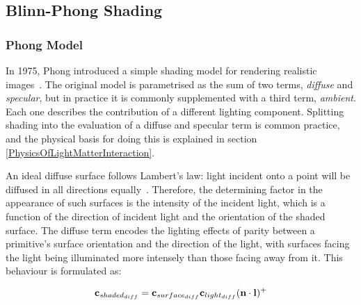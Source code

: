 \subsection{Blinn-Phong Shading} \label{BlinnPhongShading}

\subsubsection{Phong Model}

In 1975, Phong introduced a simple shading model for rendering realistic images~\cite{PhongShading}. The original model is parametrised as the sum of two terms, \textit{diffuse} and \textit{specular}, but in practice it is commonly supplemented with a third term, \textit{ambient}. Each one describes the contribution of a different lighting component. Splitting shading into the evaluation of a diffuse and specular term is common practice, and the physical basis for doing this is explained in section \ref{PhysicsOfLightMatterInteraction}.

An ideal diffuse surface follows Lambert's law: light incident onto a point will be diffused in all directions equally~\cite{Lambert}. Therefore, the determining factor in the appearance of such surfaces is the intensity of the incident light, which is a function of the direction of incident light and the orientation of the shaded surface. The diffuse term encodes the lighting effects of parity between a primitive's surface orientation and the direction of the light, with surfaces facing the light being illuminated more intensely than those facing away from it. This behaviour is formulated as:

\begin{equation}
	\mathbf{c}_{shaded_{diff}} = \mathbf{c}_{surface_{diff}}\mathbf{c}_{light_{diff}}(\mathbf{n}\cdot\mathbf{l})^+
\end{equation}


